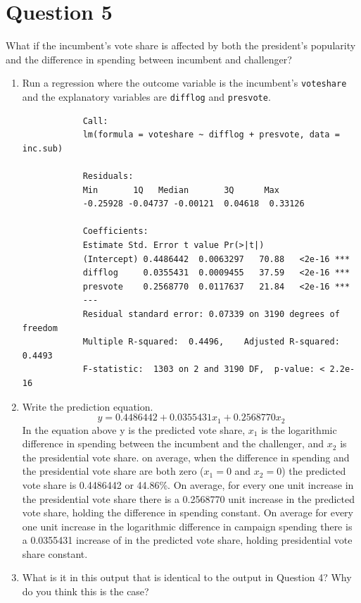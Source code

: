 \documentclass[12pt,letterpaper]{article}
\begin{document}
\section*{Question 5}
\noindent What if the incumbent's vote share is affected by both the president's popularity and the difference in spending between incumbent and challenger? 
	\begin{enumerate}
		\item Run a regression where the outcome variable is the incumbent's \texttt{voteshare} and the explanatory variables are \texttt{difflog} and \texttt{presvote}.
		
		\begin{lstlisting}
			Call:
			lm(formula = voteshare ~ difflog + presvote, data = inc.sub)
			
			Residuals:
			Min       1Q   Median       3Q      Max 
			-0.25928 -0.04737 -0.00121  0.04618  0.33126 
			
			Coefficients:
			Estimate Std. Error t value Pr(>|t|)    
			(Intercept) 0.4486442  0.0063297   70.88   <2e-16 ***
			difflog     0.0355431  0.0009455   37.59   <2e-16 ***
			presvote    0.2568770  0.0117637   21.84   <2e-16 ***
			---
			Residual standard error: 0.07339 on 3190 degrees of freedom
			Multiple R-squared:  0.4496,	Adjusted R-squared:  0.4493 
			F-statistic:  1303 on 2 and 3190 DF,  p-value: < 2.2e-16
		\end{lstlisting}
		\vspace{2cm}
		\item Write the prediction equation.
		\begin{equation}
			y = 0.4486442 + 0.0355431x_1 + 0.2568770x_2
		\end{equation}	
		\noindent In the equation above y is the predicted vote share, $x_1$ is the logarithmic difference in spending between the incumbent and the challenger, and $x_2$ is the presidential vote share. on average, when the difference in spending and the presidential vote share are both zero ($x_1 = 0$ and $x_2 = 0$) the predicted vote share is 0.4486442 or 44.86\%. On average, for every one unit increase in the presidential vote share there is a 0.2568770 unit increase in the predicted vote share, holding the difference in spending constant. On average for every one unit increase in the logarithmic difference in campaign spending there is a 0.0355431 increase of in the predicted vote share, holding presidential vote share constant.
		 \vspace{2cm}
		\item What is it in this output that is identical to the output in Question 4? Why do you think this is the case?\vspace{.5cm}
		

\end{enumerate}
\end{document}
